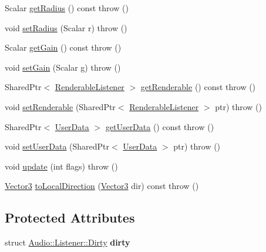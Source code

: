 \begin{DoxyCompactItemize}
\item 
Scalar \hyperlink{classAudio_1_1Listener_a6a1b505e48441318cbe29ee81ea754dd}{get\+Radius} () const   throw ()
\item 
void \hyperlink{classAudio_1_1Listener_a19d236eca43919b879f4452536bff3e2}{set\+Radius} (Scalar r)  throw ()
\item 
Scalar \hyperlink{classAudio_1_1Listener_a4c38ceb9c99863207044dbae002bbe8e}{get\+Gain} () const   throw ()
\item 
void \hyperlink{classAudio_1_1Listener_ad35f55b40ad8e2ae430923618284c4de}{set\+Gain} (Scalar g)  throw ()
\item 
Shared\+Ptr$<$ \hyperlink{classAudio_1_1RenderableListener}{Renderable\+Listener} $>$ \hyperlink{classAudio_1_1Listener_a04f05258f172ec4e25dee2f14ab8662a}{get\+Renderable} () const   throw ()
\item 
void \hyperlink{classAudio_1_1Listener_a4460b39956073a48833e730ae34e7b38}{set\+Renderable} (Shared\+Ptr$<$ \hyperlink{classAudio_1_1RenderableListener}{Renderable\+Listener} $>$ ptr)  throw ()
\item 
Shared\+Ptr$<$ \hyperlink{classAudio_1_1UserData}{User\+Data} $>$ \hyperlink{classAudio_1_1Listener_a9b6d76b31eb0fe7f5b234bbfe98c3908}{get\+User\+Data} () const   throw ()
\item 
void \hyperlink{classAudio_1_1Listener_af119eadcadc057f00402c13aa757220a}{set\+User\+Data} (Shared\+Ptr$<$ \hyperlink{classAudio_1_1UserData}{User\+Data} $>$ ptr)  throw ()
\item 
void \hyperlink{classAudio_1_1Listener_a141c18f3bba8e9bf87f99197af98fc19}{update} (int flags)  throw ()
\item 
\hyperlink{classAudio_1_1TVector3}{Vector3} \hyperlink{classAudio_1_1Listener_a2a76a3a01e7ebbe5c4c6ab256c274ad1}{to\+Local\+Direction} (\hyperlink{classAudio_1_1TVector3}{Vector3} dir) const   throw ()
\end{DoxyCompactItemize}
\subsection*{Protected Attributes}
\begin{DoxyCompactItemize}
\item 
struct \hyperlink{structAudio_1_1Listener_1_1Dirty}{Audio\+::\+Listener\+::\+Dirty} {\bfseries dirty}\hypertarget{classAudio_1_1Listener_ad619e0529b365f8036b0a48807c0436d}{}\label{classAudio_1_1Listener_ad619e0529b365f8036b0a48807c0436d}

\end{DoxyCompactItemize}


